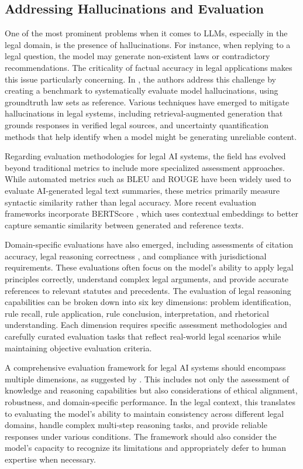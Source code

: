 \subsection{Addressing Hallucinations and Evaluation}
One of the most prominent problems when it comes to LLMs, especially in the legal domain, 
is the presence of hallucinations. For instance, when replying to a legal question, 
the model may generate non-existent laws or contradictory recommendations. 
The criticality of factual accuracy in legal applications makes this issue particularly concerning.
In \cite{hu2025finetuninglargelanguagemodels}, the authors address this challenge by creating a 
benchmark to systematically evaluate model hallucinations, using groundtruth law sets as reference.
Various techniques have emerged to mitigate hallucinations in legal systems, including retrieval-augmented
generation that grounds responses in verified legal sources, and uncertainty quantification methods
that help identify when a model might be generating unreliable content.

Regarding evaluation methodologies for legal AI systems, the field has evolved beyond traditional metrics
to include more specialized assessment approaches. While automated metrics such as BLEU \cite{Papineni_bleu} 
and ROUGE \cite{lin-2004-rouge} have been widely used to evaluate AI-generated legal text summaries, 
these metrics primarily measure syntactic similarity rather than legal accuracy. More recent evaluation 
frameworks incorporate BERTScore \cite{zhang2020bertscoreevaluatingtextgeneration}, which uses contextual 
embeddings to better capture semantic similarity between generated and reference texts. 

Domain-specific evaluations have also emerged, including assessments of citation accuracy, 
legal reasoning correctness \cite{guha2023legalbench}, and compliance with jurisdictional requirements.
These evaluations often focus on the model's ability to apply legal principles correctly, 
understand complex legal arguments, and provide accurate references to relevant statutes and precedents.
The evaluation of legal reasoning capabilities can be broken down into six key dimensions: problem identification, 
rule recall, rule application, rule conclusion, interpretation, and rhetorical understanding. Each dimension 
requires specific assessment methodologies and carefully curated evaluation tasks that reflect real-world legal 
scenarios while maintaining objective evaluation criteria.

A comprehensive evaluation framework for legal AI systems should encompass multiple dimensions, as suggested by \cite{guo2023evaluating}. 
This includes not only the assessment of knowledge and reasoning capabilities but also considerations of ethical alignment, 
robustness, and domain-specific performance. In the legal context, this translates to evaluating the model's ability to 
maintain consistency across different legal domains, handle complex multi-step reasoning tasks, and provide reliable 
responses under various conditions. The framework should also consider the model's capacity to recognize its limitations 
and appropriately defer to human expertise when necessary.

